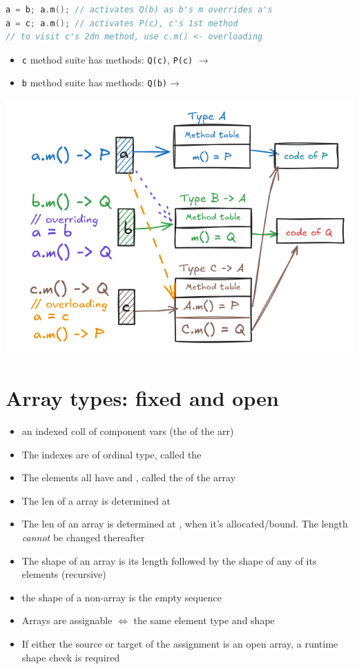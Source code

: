 \documentclass[10pt,a4paper,landscape]{article}
\begin{document}
\begin{multicols*}{3}
\begin{lstlisting}[language=c]
a = b; a.m(); // activates Q(b) as b's m overrides a's
a = c; a.m(); // activates P(c), c's 1st method
// to visit c's 2dn method, use c.m() <- overloading
\end{lstlisting}
\begin{itemize}
\item \texttt{c} method suite has  methods: \texttt{Q(c)}, \texttt{P(c)} $\to$ 
\item \texttt{b} method suite has  methods: \texttt{Q(b)}$\to$ 
\end{itemize}
\includegraphics*[width=\linewidth]{img/overloadevsoverride}

\section*{Array types: fixed and open}
\begin{minipage}{\linewidth}
\begin{itemize}
\item an indexed coll of component vars (the  of the arr)
\item The indexes are of ordinal type, called the 
\item The elements all have  and , called the  of the array
\item The len of a  array is determined at 
\item The len of an  array is determined at , when it's allocated/bound. The length \emph{cannot} be changed thereafter
\item The shape of an array is its length followed by the shape of any of its elements (recursive)
\item the shape of a non-array is the empty sequence
\item Arrays are assignable $\Leftrightarrow$ the same element type and shape
\item If either the source or target of the assignment is an open array, a runtime shape check is required
\end{itemize}
\end{minipage}

\end{multicols*}
\end{document}

